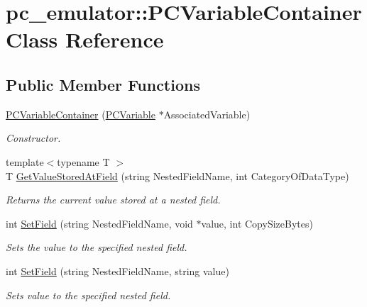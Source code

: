 \hypertarget{classpc__emulator_1_1PCVariableContainer}{}\section{pc\+\_\+emulator\+:\+:P\+C\+Variable\+Container Class Reference}
\label{classpc__emulator_1_1PCVariableContainer}
\subsection*{Public Member Functions}
\begin{DoxyCompactItemize}
\item 
\hyperlink{classpc__emulator_1_1PCVariableContainer_a9e311e87909b9eb1a296d5a9a7d99b12}{P\+C\+Variable\+Container} (\hyperlink{classpc__emulator_1_1PCVariable}{P\+C\+Variable} $\ast$Associated\+Variable)\hypertarget{classpc__emulator_1_1PCVariableContainer_a9e311e87909b9eb1a296d5a9a7d99b12}{}\label{classpc__emulator_1_1PCVariableContainer_a9e311e87909b9eb1a296d5a9a7d99b12}

\begin{DoxyCompactList}\small\item\em Constructor. \end{DoxyCompactList}\item 
{\footnotesize template$<$typename T $>$ }\\T \hyperlink{classpc__emulator_1_1PCVariableContainer_ae4cd77bbd392e5a3fce3c320e466a66f}{Get\+Value\+Stored\+At\+Field} (string Nested\+Field\+Name, int Category\+Of\+Data\+Type)
\begin{DoxyCompactList}\small\item\em Returns the current value stored at a nested field. \end{DoxyCompactList}\item 
int \hyperlink{classpc__emulator_1_1PCVariableContainer_a4d40aee4f0cd19a0ae7b7ea0e3ed22ed}{Set\+Field} (string Nested\+Field\+Name, void $\ast$value, int Copy\+Size\+Bytes)
\begin{DoxyCompactList}\small\item\em Sets the value to the specified nested field. \end{DoxyCompactList}\item 
int \hyperlink{classpc__emulator_1_1PCVariableContainer_a2fc5ee4f597f99a5a82576921388fd70}{Set\+Field} (string Nested\+Field\+Name, string value)
\begin{DoxyCompactList}\small\item\em Sets value to the specified nested field. \end{DoxyCompactList}\end{DoxyCompactItemize}



